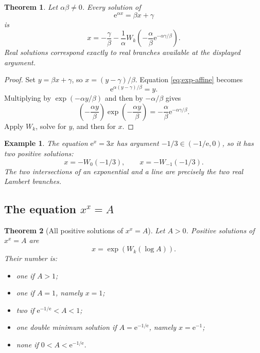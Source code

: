 \documentclass[11pt]{article}
\newtheorem{theorem}{Theorem}[section]
\newtheorem{example}[example]{Example}
\theoremstyle{remark}
\newcommand{\ee}{\mathrm e}
\begin{document}
\begin{theorem}\label{thm:exp-affine}
Let \(\alpha\beta\neq0\).  Every solution of
\begin{equation}\label{eq:exp-affine}
       \ee^{\alpha x}=\beta x+\gamma
\end{equation}
is
\begin{equation}\label{eq:exp-affine-sol}
 \boxed{\displaystyle
 x=-\frac{\gamma}{\beta}
   -\frac1\alpha
 W_k\left(
  -\frac{\alpha}{\beta}
  \ee^{-\alpha\gamma/\beta}
 \right).}
\end{equation}
Real solutions correspond exactly to real branches available at the
displayed argument.
\end{theorem}

\begin{proof}
Set \(y=\beta x+\gamma\), so \(x=(y-\gamma)/\beta\).  Equation
\eqref{eq:exp-affine} becomes
\[
       \ee^{\alpha(y-\gamma)/\beta}=y.
\]
Multiplying by \(\exp(-\alpha y/\beta)\) and then by
\(-\alpha/\beta\) gives
\[
 \left(-\frac{\alpha y}{\beta}\right)
 \exp\left(-\frac{\alpha y}{\beta}\right)
 =
 -\frac{\alpha}{\beta}\ee^{-\alpha\gamma/\beta}.
\]
Apply \(W_k\), solve for \(y\), and then for \(x\).
\end{proof}

\begin{example}
The equation \(\ee^x=3x\) has argument \(-1/3\in(-1/\ee,0)\), so it has
two positive solutions:
\[
       x=-W_0(-1/3),\qquad x=-W_{-1}(-1/3).
\]
The two intersections of an exponential and a line are precisely the two
real Lambert branches.
\end{example}

\subsection{The equation \texorpdfstring{\(x^x=A\)}{x to the x equals A}}

\begin{theorem}[All positive solutions of \(x^x=A\)]\label{thm:xtox}
Let \(A>0\).  Positive solutions of \(x^x=A\) are
\begin{equation}\label{eq:xtox}
       x=\exp(W_k(\log A)).
\end{equation}
Their number is:
\begin{itemize}
\item one if \(A>1\);
\item one if \(A=1\), namely \(x=1\);
\item two if \(\ee^{-1/\ee}<A<1\);
\item one double minimum solution if \(A=\ee^{-1/\ee}\), namely
\(x=\ee^{-1}\);
\item none if \(0<A<\ee^{-1/\ee}\).
\end{itemize}
\end{theorem}
\end{document}
